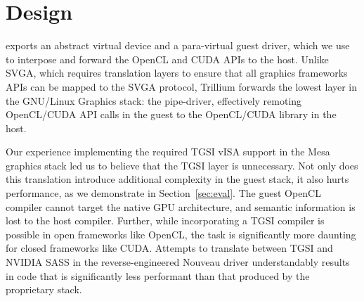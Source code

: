 \section{Design}
\label{sec_design}
\label{sec:trillium_design}

\Trillium exports an abstract virtual device and a para-virtual guest driver,
which we use to interpose and forward the OpenCL and CUDA APIs to the host.
Unlike SVGA, which requires translation
layers to ensure that all graphics frameworks APIs can be mapped to the SVGA protocol,
Trillium forwards the lowest layer in the GNU/Linux Graphics stack: the pipe-driver,
effectively remoting OpenCL/CUDA API calls in the guest to the OpenCL/CUDA library in the host.



Our experience implementing the required TGSI vISA support in the Mesa
graphics stack led us to believe that the TGSI layer is unnecessary.
Not only does this translation introduce additional complexity in the guest
stack, it also hurts performance, as we demonstrate in Section~\ref{sec:eval}.
The guest OpenCL compiler cannot target the native GPU architecture,
and semantic information is lost to the host compiler.
Further, while incorporating a TGSI compiler is possible in open frameworks like OpenCL,
the task is significantly more daunting for closed frameworks like CUDA.
Attempts to translate between TGSI and NVIDIA SASS in the reverse-engineered Nouveau driver
understandably results in code that is significantly less performant
than that produced by the proprietary stack.

